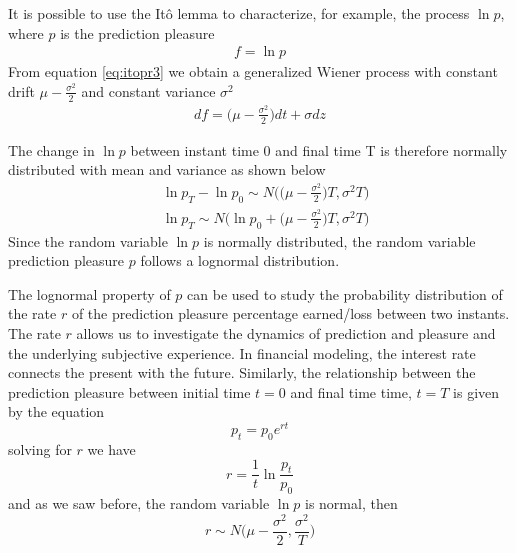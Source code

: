 \documentclass[11pt, onecolumn]{article}
\begin{document}
It is possible to use the  It\^{o} lemma to characterize, for example, the process $\ln p$, where $p$ is the prediction pleasure
\begin{equation}
\begin{split}
  f = \ln p
\end{split}
\label{eq:slns}
\end{equation} 
From equation \ref{eq:itopr3} we obtain a generalized Wiener process with constant drift $\mu - \frac{\sigma^2}{2}$ and constant variance $\sigma^2$ 
\begin{equation*}
\begin{split}
df =  \bigg( \mu - \frac{\sigma^2}{2} \bigg)dt + \sigma dz
\end{split}
\label{eq:slns2}
\end{equation*} 

The change in $\ln p $ between instant time 0 and final time T is therefore normally distributed with mean and variance as shown below
\begin{equation*}
\begin{split}
 & \ln p_T - \ln p_0 \sim N \bigg( \big(\mu - \frac{\sigma ^2}{2} \big) T, \sigma^2 T \bigg) \\
 & \ln p_T  \sim N \bigg( \ln p_0 + \big(\mu - \frac{\sigma ^2}{2} \big) T, \sigma^2 T \bigg) 
\end{split}
\label{eq:slns3}
\end{equation*}
Since the random variable $\ln p$ is normally distributed, the random variable  prediction pleasure $p$ follows a lognormal distribution. 
%
%

The lognormal property of $p$ can be used to study the
probability distribution of the rate $r$ of the prediction pleasure percentage earned/loss between two instants. The rate $r$ allows us to investigate the dynamics of prediction and pleasure and the underlying subjective experience. 
In financial modeling, the interest rate connects the present with the future. Similarly, the relationship between the prediction pleasure between initial time $t = 0$ and final time time, $t=T$ is given by the equation
\begin{equation*}
   p_t = p_0 e^{r t}
\label{eq:vpbpt}
\end{equation*}
solving for $r$ we have
\begin{equation*}
   r = \frac{1}{t}\ln \frac{p_t}{p_0}
\label{eq:vpbpt2}
\end{equation*}
and as we saw before, the random variable $\ln p$ is normal, then   
\begin{equation}
   r \sim  N \bigg( \mu - \frac{\sigma ^2}{2} , \frac{\sigma^2}{T} \bigg) 
\label{eq:vpbpt3}
\end{equation}
\end{document}
